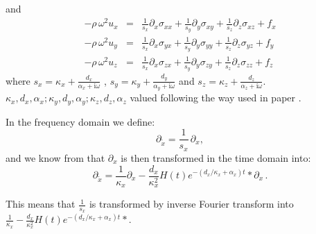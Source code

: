 \documentclass[onecolumn,extra]{gji_modified_cours_UPPA}
\renewcommand{\cite}[1]{\citet{#1}}
\newcommand{\myiomega}{\mathrm{i} \omega}
\begin{document}
%
\noindent and
%
\begin{eqnarray}
- \rho \, \omega^2 u_x  & = & \frac{1}{s_x} \partial_x \sigma_{xx} + \frac{1}{s_y} \partial_y \sigma_{xy} + \frac{1}{s_z} \partial_z \sigma_{xz} + f_x \nonumber \\
- \rho \, \omega^2 u_y  & = & \frac{1}{s_x} \partial_x \sigma_{yx} + \frac{1}{s_y} \partial_y \sigma_{yy} + \frac{1}{s_z} \partial_z \sigma_{yz} + f_y \nonumber \\
- \rho \, \omega^2 u_z  & = & \frac{1}{s_x} \partial_x \sigma_{zx} + \frac{1}{s_y} \partial_y \sigma_{zy} + \frac{1}{s_z} \partial_z \sigma_{zz} + f_z
\end{eqnarray}
%
where $s_x = \kappa_x + \frac{d_x}{\alpha_x + \myiomega}$ , $s_y = \kappa_y + \frac{d_y}{\alpha_y + \myiomega}$ and
$s_z = \kappa_z + \frac{d_z}{\alpha_z + \myiomega}$. $\kappa_x ,d_x,\alpha_x;\kappa_y ,d_y,\alpha_y;\kappa_z ,d_z,\alpha_z$
valued following the way used in paper \cite{FeVi05}.



\noindent In the frequency domain we define:
\begin{equation}
\partial_{\tilde{x}} = \frac{1}{s_x}\, \partial_ x,
\label{diffmapping}
\end{equation}
%
and we know from \cite{KoMa07} that $\partial_x$ is then transformed in the time domain into:
\begin{equation}
\partial_{\tilde{x}}= \frac{1}{\kappa_x} \partial_{x}
- \frac{d_x}{\kappa_x^2} H(t) e^{-(d_x/\kappa_x + \alpha_x)t} * \partial_ x \, .
\end{equation}

\noindent This means that $\frac{1}{s_x}$ is transformed by inverse Fourier transform into
$\frac{1}{\kappa_x} - \frac{d_x}{\kappa_x^2} H(t) e^{-(d_x/\kappa_x + \alpha_x)t} *$.


\clearpage
\end{document}
